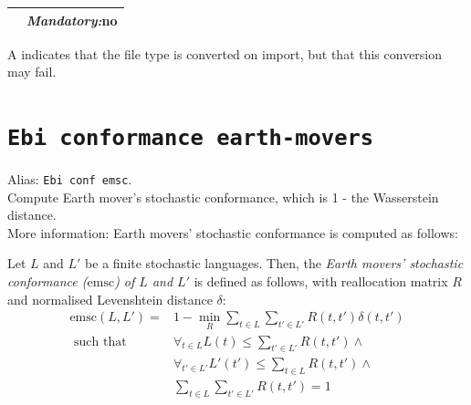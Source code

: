 {\begin{tabularx}{\linewidth}{lX}
&\textit{Mandatory:}\quad no\\
\bottomrule
\end{tabularx}
A \textdagger{} indicates that the file type is converted on import, but that this conversion may fail.
\clearpage\section{\texttt{Ebi conformance earth-movers}}
\label{command:Ebi conformance earth-movers}
Alias: \texttt{Ebi conf emsc}.\\
Compute Earth mover's stochastic conformance, which is 1 - the Wasserstein distance.\\
More information: Earth movers' stochastic conformance is computed as follows:
        
        \begin{definition}
            \label{def:emsc}
                Let $L$ and $L'$ be a finite stochastic languages.
                Then, the \emph{Earth movers' stochastic conformance ($\text{emsc}$) of $L$ and $L'$} is defined as follows, with reallocation matrix $R$ and normalised Levenshtein distance $\delta$:
                \begin{align*}
                    \text{emsc}(L, L') ={}& 1 - \min_{R} \sum_{t \in L}\sum_{t' \in L'} R(t, t') \delta(t,t')\\
                    \text{ such that } & \forall_{t\in L} L(t) \leq \sum_{t' \in L'} R(t, t') \land{}\\
                    & \forall_{t' \in L'} L'(t') \leq \sum_{t \in L} R(t, t') \land{}\\
                    & \sum_{t \in L} \sum_{t' \in L'} R(t,t') = 1
                \end{align*}       
            \end{definition}
            
}
